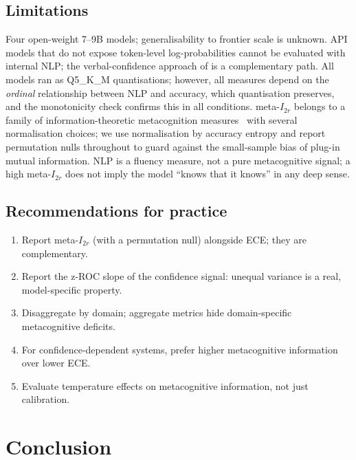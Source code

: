 \documentclass{article}
\begin{document}
\subsection{Limitations}
\label{sec:limitations}

Four open-weight 7--9B models; generalisability to frontier scale is unknown. API models that do not expose token-level log-probabilities cannot be evaluated with internal NLP; the verbal-confidence approach of \citet{dai2026rescaling} is a complementary path. All models ran as Q5\_K\_M quantisations; however, all measures depend on the \emph{ordinal} relationship between NLP and accuracy, which quantisation preserves, and the monotonicity check confirms this in all conditions. meta-$I_{2r}$ belongs to a family of information-theoretic metacognition measures~\citep{dayan2023metacognitive, fitousi2025information} with several normalisation choices; we use normalisation by accuracy entropy and report permutation nulls throughout to guard against the small-sample bias of plug-in mutual information. NLP is a fluency measure, not a pure metacognitive signal; a high meta-$I_{2r}$ does not imply the model ``knows that it knows'' in any deep sense.

\subsection{Recommendations for practice}
\begin{enumerate}[leftmargin=*, nosep]
    \item Report meta-$I_{2r}$ (with a permutation null) alongside ECE; they are complementary.
    \item Report the z-ROC slope of the confidence signal: unequal variance is a real, model-specific property.
    \item Disaggregate by domain; aggregate metrics hide domain-specific metacognitive deficits.
    \item For confidence-dependent systems, prefer higher metacognitive information over lower ECE.
    \item Evaluate temperature effects on metacognitive information, not just calibration.
\end{enumerate}

\section{Conclusion}
\end{document}
